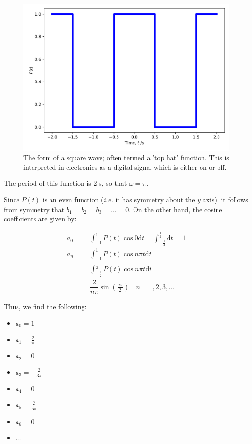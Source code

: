 \documentclass[
]{book}
\providecommand{\tightlist}{%
  \setlength{\itemsep}{0pt}\setlength{\parskip}{0pt}}
\begin{document}
\begin{figure}

{\centering \includegraphics[width=0.7\linewidth]{visualisations/ch11-squarewave1} 

}

\caption{The form of a square wave; often termed a 'top hat' function. This is interpreted in electronics as a digital signal which is either on or off.}\label{fig:ch11-squarewave1}
\end{figure}

The period of this function is 2 s, so that \(\omega = \pi\).

Since \(P(t)\) is an even function (\emph{i.e.} it has symmetry about the \(y\) axis), it follows from symmetry that \(b_1 = b_2 = b_3 = \dots = 0\). On the other hand, the cosine coefficients are given by:

\begin{equation}
\begin{array}{rcl}
a_0 &=& \displaystyle{\int_{-1}^{1}} P(t) \cos 0 \mathrm{d}t = \displaystyle{\int_{-\frac{1}{2}}^{\frac{1}{2}}} \mathrm{d}t = 1 \\
a_n &=& \displaystyle{\int_{-1}^{1}} P(t) \cos n \pi t \mathrm{d}t \\
    &=& \displaystyle{\int_{-\frac{1}{2}}^{\frac{1}{2}}} P(t) \cos n \pi t \mathrm{d}t \\
    &=& \dfrac{2}{n\pi} \sin \left( \frac{n\pi}{2} \right) \quad n = 1, 2, 3, \dots
\end{array}
\end{equation}

Thus, we find the following:

\begin{itemize}
\tightlist
\item
  \(a_0 = 1\)
\item
  \(a_1 = \frac{2}{\pi}\)
\item
  \(a_2 = 0\)
\item
  \(a_3 = -\frac{2}{3\pi}\)
\item
  \(a_4 = 0\)
\item
  \(a_5 = \frac{2}{5\pi}\)
\item
  \(a_6 = 0\)
\item
  \(\dots\)
\end{itemize}
\end{document}
